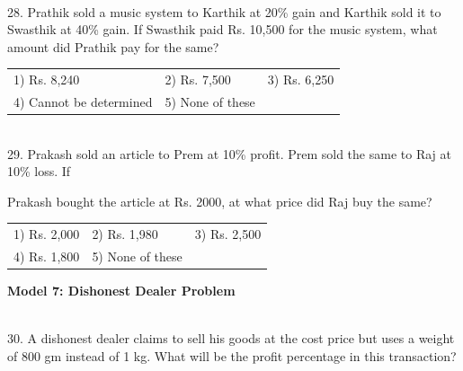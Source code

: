 \documentclass{article}
\begin{document}
	\noindent 
	
	\noindent 
	
	\noindent 
	
	\noindent  \\ 28. Prathik sold a music system to Karthik at 20\% gain and Karthik sold it to Swasthik at 40\% gain. If Swasthik paid Rs. 10,500 for the music system, what amount did Prathik pay for the same?
	
	\noindent \begin{tabular}{p{1.7in} p{1.6in} p{1.6in}} \\ 
 1) Rs. 8,240                                                       & 2) Rs. 7,500                                    & 3) Rs. 6,250
	
	\noindent 
	
	\noindent \\
4) Cannot be determined                            & 5) None of these \\
\end{tabular}
	
	\noindent 
	
	\noindent 
	
	\noindent 
	
	\noindent \\  29. Prakash sold an article to Prem at 10\% profit. Prem sold the same to Raj at 10\% loss. If
	
	\noindent 
	
	\noindent Prakash bought the article at Rs. 2000, at what price did Raj buy the same?
	
	\noindent 
	
	\noindent \begin{tabular}{p{1.7in} p{1.6in} p{1.6in}} \\ 
 1) Rs. 2,000                & 2) Rs. 1,980         & 3) Rs. 2,500         \\
4) Rs. 1,800         & 5) None of these \\
\end{tabular}
	
	\noindent 
	
	\noindent 
	
	\noindent 
	
	\noindent 
	
	\noindent \textbf{Model 7: Dishonest Dealer Problem}
	
	\noindent 
	
	\noindent \\  30. A dishonest dealer claims to sell his goods at the cost price but uses a weight of 800 gm instead of 1 kg. What will be the profit percentage in this transaction?
	
\end{document}
